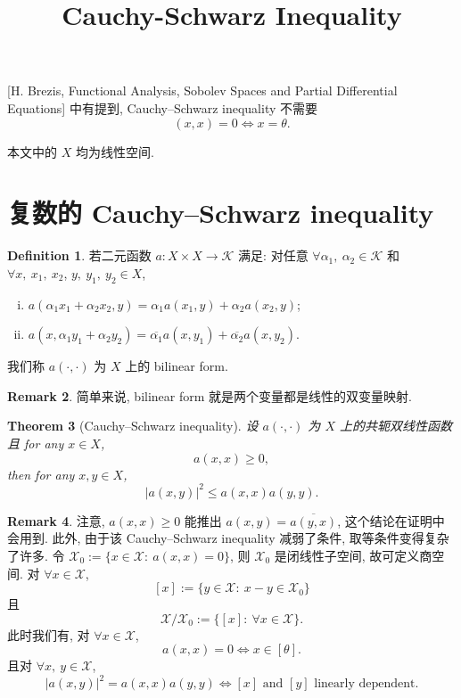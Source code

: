 \documentclass[a4paper,12pt]{article}
\title{Cauchy-Schwarz Inequality}
\newtheorem{theorem}{Theorem}[section]
\theoremstyle{definition}
\newtheorem{remark}[theorem]{Remark}
\newtheorem{definition}[theorem]{Definition}
\begin{document}
\maketitle

[H. Brezis, Functional Analysis, Sobolev Spaces and Partial Differential Equations] 
中有提到, Cauchy–Schwarz inequality 不需要
$$
    (x, x) = 0 \Longleftrightarrow x = \theta.
$$

本文中的 $ X $ 均为线性空间.

\section{复数的 Cauchy–Schwarz inequality}

\begin{definition}
    若二元函数 $ a: X \times X \to \mathcal{K} $ 满足: 
    对任意 $ \forall \alpha_1,\ \alpha_2 \in \mathcal{K} $ 和 $ \forall x,\ x_1,\ x_2 $, $ y,\ y_1,\ y_2 \in X $,
    \begin{enumerate}[(i)]
        \item $ a(\alpha_1 x_1 + \alpha_2 x_2, y) = \alpha_1 a(x_1, y) + \alpha_2 a(x_2, y) $;
        \item $ a(x, \alpha_1 y_1 + \alpha_2 y_2) = \overline{\alpha_1} a(x, y_1) + \overline{\alpha_2} a(x, y_2) $.
    \end{enumerate}
    我们称 $ a(\cdot, \cdot) $ 为 $ X $ 上的 bilinear form.
\end{definition}

\begin{remark}
    简单来说, bilinear form 就是两个变量都是线性的双变量映射.
\end{remark}

\begin{theorem}[Cauchy–Schwarz inequality] \label{123}
    设 $ a(\cdot, \cdot) $ 为 $ X $ 上的共轭双线性函数且 for any $ x \in X $,
    $$
        a(x, x) \geq 0,
    $$
    then for any $  x, y \in X $,
    \begin{equation} \label{result}
        |a(x, y)|^2 \leq a(x, x) a(y, y).
    \end{equation}
\end{theorem}

\begin{remark}
    注意, $ a(x, x) \geq 0 $ 能推出 $ a(x, y) = \overline{a(y, x)} $, 这个结论在证明中会用到.
    此外, 由于该 Cauchy–Schwarz inequality 减弱了条件, 取等条件变得复杂了许多.
    令 $ \mathcal{X}_0 := \{ x \in \mathcal{X} :\ a(x, x) = 0 \} $, 则 $ \mathcal{X}_0 $ 是闭线性子空间,
    故可定义商空间. 对 $ \forall x \in \mathcal{X} $,
    $$ 
        [x] := \{y \in \mathcal{X} :\ x - y \in \mathcal{X}_0 \} 
    $$
    且
    $$
        \mathcal{X} / \mathcal{X}_0 := \{ [x] :\ \forall x \in \mathcal{X} \}.
    $$
    此时我们有, 对 $ \forall x \in \mathcal{X} $,
    $$
        a(x, x) = 0 \Longleftrightarrow x \in [\theta].
    $$
    且对 $ \forall x,\ y \in \mathcal{X} $,
    $$
        |a(x, y)|^2 = a(x, x) a(y, y) 
            \Longleftrightarrow [x] \text{ and } [y] \text{ linearly dependent}.
    $$
\end{remark}
\end{document}
